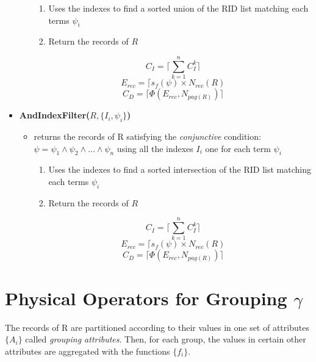 \begin{itemize}
\begin{itemize}
        \begin{enumerate}
            \item Uses the indexes to find a sorted union of the RID list matching each terms $\psi_i$
            \item Return the records of $R$
        \end{enumerate}
        $$C_I = \Bigg \lceil \sum_{k=1}^n C_I^k \Bigg \rceil$$
        $$E_{rec} = \lceil s_f(\psi)\times N_{rec}(R)$$
        $$C_D= \lceil \Phi(E_{rec}, N_{pag(R)})\rceil$$
    \end{itemize}
    \item \textbf{AndIndexFilter($R, \{I_i, \psi_i\}$)}
    \begin{itemize}
        \item returns the records of R satisfying the \textit{conjunctive} condition: $\psi = \psi_1 \land \psi_2 \land ... \land \psi_n$ using all the indexes $I_i$ one for each term $\psi_i$
        \begin{enumerate}
            \item Uses the indexes to find a sorted intersection of the RID list matching each terms $\psi_i$
            \item Return the records of $R$
        \end{enumerate}
        $$C_I = \Bigg \lceil \sum_{k=1}^n C_I^k \Bigg \rceil$$
        $$E_{rec} = \lceil s_f(\psi)\times N_{rec}(R)$$
        $$C_D= \lceil \Phi(E_{rec}, N_{pag(R)})\rceil$$
    \end{itemize}
\end{itemize}

\section{Physical Operators for Grouping $\gamma$}
The records of R are partitioned according to their values in one set of attributes $\{A_i\}$ called \textit{grouping attributes}. Then, for each group, the values in certain other attributes are aggregated with the functions $\{f_i\}$.

